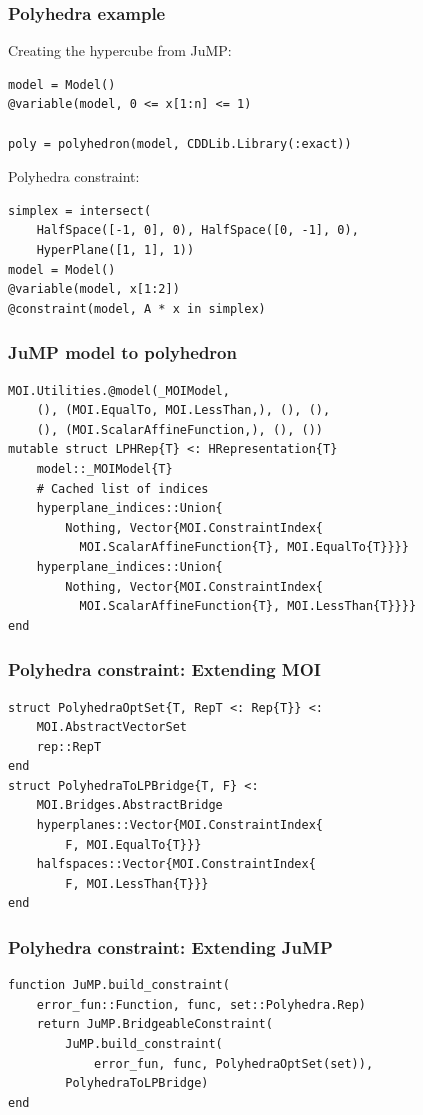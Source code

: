 \documentclass{beamer}
\begin{document}
\begin{frame}[fragile]
  \frametitle{Polyhedra example}
  Creating the hypercube from JuMP:
  \begin{verbatim}
model = Model()
@variable(model, 0 <= x[1:n] <= 1)

poly = polyhedron(model, CDDLib.Library(:exact))
  \end{verbatim}
  Polyhedra constraint:
  \begin{verbatim}
simplex = intersect(
    HalfSpace([-1, 0], 0), HalfSpace([0, -1], 0),
    HyperPlane([1, 1], 1))
model = Model()
@variable(model, x[1:2])
@constraint(model, A * x in simplex)
  \end{verbatim}
\end{frame}

\begin{frame}[fragile]
  \frametitle{JuMP model to polyhedron}
  \begin{verbatim}
MOI.Utilities.@model(_MOIModel,
    (), (MOI.EqualTo, MOI.LessThan,), (), (),
    (), (MOI.ScalarAffineFunction,), (), ())
mutable struct LPHRep{T} <: HRepresentation{T}
    model::_MOIModel{T}
    # Cached list of indices
    hyperplane_indices::Union{
        Nothing, Vector{MOI.ConstraintIndex{
          MOI.ScalarAffineFunction{T}, MOI.EqualTo{T}}}}
    hyperplane_indices::Union{
        Nothing, Vector{MOI.ConstraintIndex{
          MOI.ScalarAffineFunction{T}, MOI.LessThan{T}}}}
end
  \end{verbatim}
\end{frame}

\begin{frame}[fragile]
  \frametitle{Polyhedra constraint: Extending MOI}
  \begin{verbatim}
struct PolyhedraOptSet{T, RepT <: Rep{T}} <:
    MOI.AbstractVectorSet
    rep::RepT
end
struct PolyhedraToLPBridge{T, F} <:
    MOI.Bridges.AbstractBridge
    hyperplanes::Vector{MOI.ConstraintIndex{
        F, MOI.EqualTo{T}}}
    halfspaces::Vector{MOI.ConstraintIndex{
        F, MOI.LessThan{T}}}
end
  \end{verbatim}
\end{frame}
\begin{frame}[fragile]
  \frametitle{Polyhedra constraint: Extending JuMP}
  \begin{verbatim}
function JuMP.build_constraint(
    error_fun::Function, func, set::Polyhedra.Rep)
    return JuMP.BridgeableConstraint(
        JuMP.build_constraint(
            error_fun, func, PolyhedraOptSet(set)),
        PolyhedraToLPBridge)
end
  \end{verbatim}
\end{frame}
\end{document}
